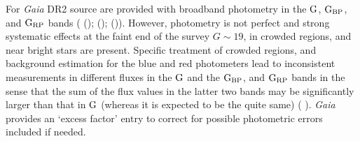 For \textit{Gaia} DR2 source are provided with broadband photometry in the $\textnormal{G}$,  $\textnormal{G}_\textnormal{BP}$, and  $\textnormal{G}_\textnormal{RP}$ bands ( (\citeyear{2017A&A...599A..32V});  (\citeyear{2017A&A...600A..51E});  (\citeyear{2018arXiv180409366L})). However, photometry is not perfect and strong systematic effects at the faint end of the survey $\textit{G}\sim19$, in crowded regions, and near bright stars are present. Specific treatment of crowded regions, and background estimation for the blue and red photometers lead to inconsistent measurements in different fluxes in the $\textnormal{G}$ and the $\textnormal{G}_\textnormal{BP}$, and  $\textnormal{G}_\textnormal{RP}$ bands in the sense that the sum of the flux values in the latter two bands may be significantly larger than that in $\textnormal{G}$ (whereas it is expected to be the quite same) ( \citeyear{2018arXiv180409365G}). \textit{Gaia} provides an `excess factor' entry to correct for possible photometric errors included if needed. 


